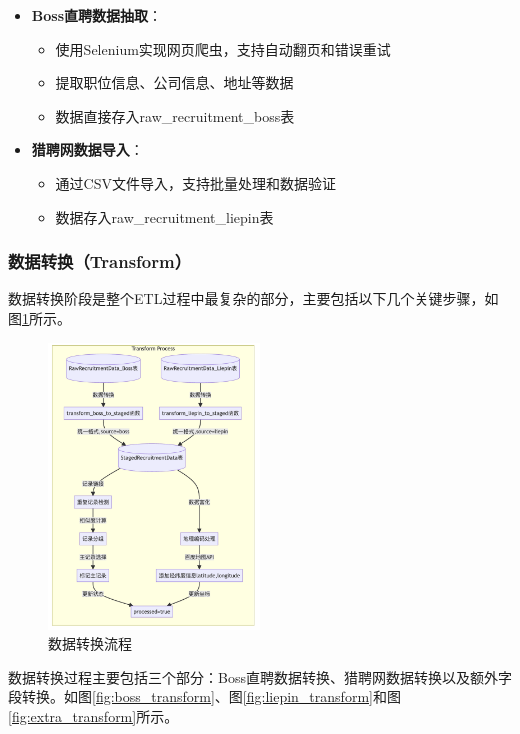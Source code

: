 \begin{itemize}
    \item \textbf{Boss直聘数据抽取}：
    \begin{itemize}
        \item 使用Selenium实现网页爬虫，支持自动翻页和错误重试
        \item 提取职位信息、公司信息、地址等数据
        \item 数据直接存入raw\_recruitment\_boss表
    \end{itemize}
    
    \item \textbf{猎聘网数据导入}：
    \begin{itemize}
        \item 通过CSV文件导入，支持批量处理和数据验证
        \item 数据存入raw\_recruitment\_liepin表
    \end{itemize}
\end{itemize}

\subsubsection{数据转换（Transform）}
数据转换阶段是整个ETL过程中最复杂的部分，主要包括以下几个关键步骤，如图\ref{fig:ETL_transform}所示。

\begin{figure}[htbp]
    \centering
    \includegraphics[width=0.5\textwidth]{figures/transform.png}
    \caption{数据转换流程}
    \label{fig:ETL_transform}
\end{figure}

数据转换过程主要包括三个部分：Boss直聘数据转换、猎聘网数据转换以及额外字段转换。如图\ref{fig:boss_transform}、图\ref{fig:liepin_transform}和图\ref{fig:extra_transform}所示。


